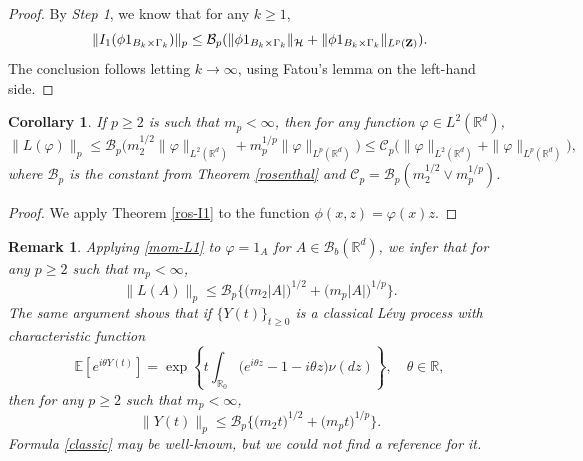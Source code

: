 \documentclass[12pt]{article}
\newtheorem{corollary}[theorem]{Corollary}
\newtheorem{remark}[theorem]{Remark}
\def\cB{\mathcal{B}}
\def\cC{\mathcal{C}}
\def\cH{\mathcal{H}}
\def\bE{\mathbb{E}}
\def\bR{\mathbb{R}}
\begin{document}
\begin{proof}
By {\em Step 1}, we know that for any $k\geq 1$,
\[
\|I_1(\phi 1_{B_k \times \Gamma_k})\|_p \leq \cB_p (\|\phi 1_{B_k \times \Gamma_k}\|_{\cH}+\|\phi 1_{B_k \times \Gamma_k}\|_{L^p({\bf Z})}).
\]
The conclusion follows letting $k \to \infty$, using Fatou's lemma on the left-hand side.

\end{proof}


\begin{corollary}
\label{cor-p-mom-L}
If $p\geq 2$ is such that $m_p<\infty$, then for any function $\varphi \in L^2(\bR^d)$,
\begin{equation}
\label{mom-L1}
\|L(\varphi)\|_p \leq \cB_p \Big( m_2^{1/2}\|\varphi\|_{L^2(\bR^d)}+ m_p^{1/p} \|\varphi\|_{L^p(\bR^d)}\Big) \leq \cC_p \Big( \|\varphi\|_{L^2(\bR^d)}+  \|\varphi\|_{L^p(\bR^d)}\Big),
\end{equation}
where $\cB_p$ is the constant from Theorem \ref{rosenthal} and $\cC_p=\cB_p (m_2^{1/2} \vee m_p^{1/p})$.
\end{corollary}


\begin{proof}
We apply Theorem \ref{ros-I1} to the function $\phi(x,z)=\varphi(x)z$.
\end{proof}




\begin{remark}
{\rm Applying \eqref{mom-L1} to $\varphi=1_A$ for $A \in \cB_b(\bR^d)$, we infer that for any $p\geq 2$ such that $m_p<\infty$,
\[
\|L(A)\|_p \leq \cB_p\Big\{\big(m_2|A|\big)^{1/2}+\big(m_p|A|\big)^{1/p}\Big\}.
\]
The same argument shows that if $\{Y(t)\}_{t\geq 0}$ is a classical L\'evy process with characteristic function
\[
\bE[e^{i\theta Y(t)}]=\exp\left\{t\int_{\bR_0}\big(e^{i \theta z}-1-i\theta z \big) \nu(dz)\right\}, \quad \theta \in \bR, 
\]
then for any $p\geq 2$ such that $m_p<\infty$,
\begin{equation}
\label{classic}
\|Y(t)\|_p \leq \cB_p\Big\{\big(m_2t\big)^{1/2}+\big(m_p t \big)^{1/p}\Big\}.
\end{equation}
Formula \eqref{classic} may be well-known, but we could not find a reference for it.
}
\end{remark}
\end{document}
